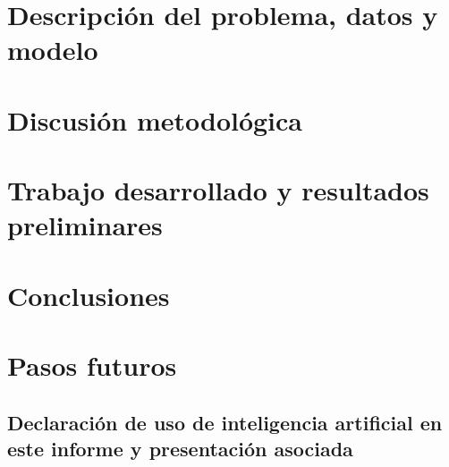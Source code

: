 \documentclass[pdftex,spanish]{pucthesis}
\begin{document}
\chapter[PROBLEMA, DATOS Y MODELO]{Descripci\'on del problema, datos y modelo}


\chapter[DISCUSI\'ON METODOL\'OGICA]{Discusi\'on metodol\'ogica}


\chapter[TRABAJO Y RESULTADOS PRELIMINARES]{Trabajo desarrollado y resultados preliminares}


\chapter[CONCLUSIONES]{Conclusiones}


\chapter[PASOS FUTUROS]{Pasos futuros}


\cleardoublepage
{} \label{references}

\renewcommand{\bibname}{BIBLIOGRAF\'IA}
\setlength{\bibitemsep}{0.3em}
{\small\singlespacing}

\appendix
\newpage
\section[Declaraci\'on de uso de IA]{Declaraci\'on de uso de inteligencia artificial en este informe y presentaci\'on asociada}

\end{document}

